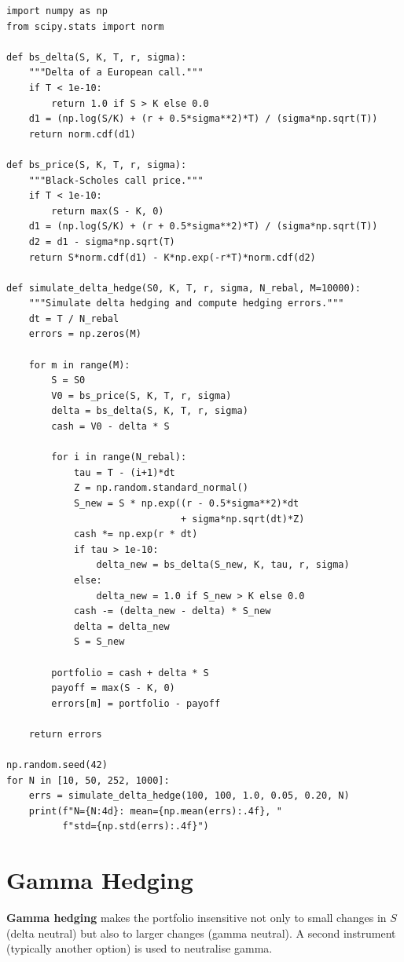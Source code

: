 \begin{codeblock}[title=\textbf{Discrete Delta-Hedging Simulation}]
\begin{verbatim}
import numpy as np
from scipy.stats import norm

def bs_delta(S, K, T, r, sigma):
    """Delta of a European call."""
    if T < 1e-10:
        return 1.0 if S > K else 0.0
    d1 = (np.log(S/K) + (r + 0.5*sigma**2)*T) / (sigma*np.sqrt(T))
    return norm.cdf(d1)

def bs_price(S, K, T, r, sigma):
    """Black-Scholes call price."""
    if T < 1e-10:
        return max(S - K, 0)
    d1 = (np.log(S/K) + (r + 0.5*sigma**2)*T) / (sigma*np.sqrt(T))
    d2 = d1 - sigma*np.sqrt(T)
    return S*norm.cdf(d1) - K*np.exp(-r*T)*norm.cdf(d2)

def simulate_delta_hedge(S0, K, T, r, sigma, N_rebal, M=10000):
    """Simulate delta hedging and compute hedging errors."""
    dt = T / N_rebal
    errors = np.zeros(M)

    for m in range(M):
        S = S0
        V0 = bs_price(S, K, T, r, sigma)
        delta = bs_delta(S, K, T, r, sigma)
        cash = V0 - delta * S

        for i in range(N_rebal):
            tau = T - (i+1)*dt
            Z = np.random.standard_normal()
            S_new = S * np.exp((r - 0.5*sigma**2)*dt
                               + sigma*np.sqrt(dt)*Z)
            cash *= np.exp(r * dt)
            if tau > 1e-10:
                delta_new = bs_delta(S_new, K, tau, r, sigma)
            else:
                delta_new = 1.0 if S_new > K else 0.0
            cash -= (delta_new - delta) * S_new
            delta = delta_new
            S = S_new

        portfolio = cash + delta * S
        payoff = max(S - K, 0)
        errors[m] = portfolio - payoff

    return errors

np.random.seed(42)
for N in [10, 50, 252, 1000]:
    errs = simulate_delta_hedge(100, 100, 1.0, 0.05, 0.20, N)
    print(f"N={N:4d}: mean={np.mean(errs):.4f}, "
          f"std={np.std(errs):.4f}")
\end{verbatim}
\end{codeblock}

\section{Gamma Hedging}

\begin{definition}
\textbf{Gamma hedging} makes the portfolio insensitive not only to small
changes in $S$ (delta neutral) but also to larger changes (gamma neutral).
A second instrument (typically another option) is used to neutralise gamma.
\end{definition}

